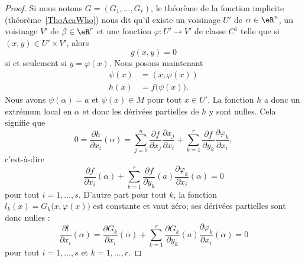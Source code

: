 \begin{proof}
    Si nous notons \( G=(G_1,\ldots, G_r)\), le théorème de la fonction implicite (théorème~\ref{ThoAcaWho})  nous dit qu'il existe un voisinage \( U'\) de \( \alpha\in \eR^n\), un voisinage \( V'\) de \( \beta\in \eR^r\) et une fonction \( \varphi\colon U'\to V'\) de classe \( C^1\) telle que si \( (x,y)\in U'\times V'\), alors
    \begin{equation}
        g(x,y)=0
    \end{equation}
    si et seulement si \( y=\varphi(x)\). Nous posons maintenant
    \begin{subequations}
        \begin{align}
            \psi(x) & =(x,\varphi(x))   \\
            h(x)    & =f\big( \psi(x) \big).
        \end{align}
    \end{subequations}
    Nous avons \( \psi(\alpha)=a\) et \( \psi(x)\in M\) pour tout \( x\in U'\). La fonction \( h\) a donc un extrémum local en \( \alpha\) et donc les dérivées partielles de \( h\) y sont nulles. Cela signifie que
    \begin{equation}
        0=\frac{ \partial h }{ \partial x_i }(\alpha)=\sum_{j=1}^n\frac{ \partial f }{ \partial x_j }\frac{ \partial x_j }{ \partial x_i }+\sum_{k=1}^r\frac{ \partial f }{ \partial y_k }\frac{ \partial \varphi_k }{ \partial x_i },
    \end{equation}
    c'est-à-dire
    \begin{equation}
        \frac{ \partial f }{ \partial x_i }(\alpha)+\sum_{k=1}^r\frac{ \partial f }{ \partial y_k }(a)\frac{ \partial \varphi_k }{ \partial x_i }(\alpha)=0
    \end{equation}
    pour tout \( i=1,\ldots, s\). D'autre part pour tout $k$, la fonction \( l_k(x)=G_k\big( x,\varphi(x) \big)\) est constante et vaut zéro; ses dérivées partielles sont donc nulles :
    \begin{equation}
        \frac{ \partial l }{ \partial x_i }(\alpha)=\frac{ \partial G_k }{ \partial x_i }(\alpha)+\sum_{k=1}^r\frac{ \partial G_k }{ \partial y_k }(a)\frac{ \partial \varphi_k }{ \partial x_i }(\alpha)=0
    \end{equation}
    pour tout \( i=1,\ldots, s\) et \( k=1,\ldots, r\).


\end{proof}
